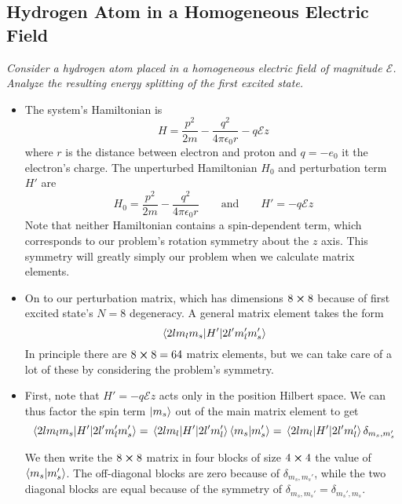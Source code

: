 \documentclass[11pt, a4paper]{article}
\newcommand{\eqtext}[1]{\qquad \text{#1} \qquad}
\newcommand{\Ham}{Hamiltonian\xspace}
\newcommand{\E}{\mathcal{E}}  %
\begin{document}
\subsection{Hydrogen Atom in a Homogeneous Electric Field}
\textit{Consider a hydrogen atom placed in a homogeneous electric field of magnitude $ \E $. Analyze the resulting energy splitting of the first excited state.}
\begin{itemize}
	\item The system's \Ham is 
	\begin{equation*}
		H = \frac{p^{2}}{2m} - \frac{q^{2}}{4\pi \epsilon_{0} r} - q \E z
	\end{equation*}
	where $ r $ is the distance between electron and proton and $ q = -e_{0} $ it the electron's charge. The unperturbed Hamiltonian $ H_{0} $ and perturbation term $ H' $ are
	\begin{equation*}
		H_{0} = \frac{p^{2}}{2m} - \frac{q^{2}}{4\pi \epsilon_{0} r} \eqtext{and} H' = - q \E z
	\end{equation*}
	Note that neither \Ham contains a spin-dependent term, which corresponds to our problem's rotation symmetry about the $ z $ axis. This symmetry will greatly simply our problem when we calculate matrix elements. 

	\item On to our perturbation matrix, which has dimensions $ 8 \cross 8 $ because of first excited state's $ N = 8 $ degeneracy. A general matrix element takes the form
	\begin{equation*}
		\mel{2lm_{l}m_{s}}{H'}{2l'm_{l}'m_{s}'} 
	\end{equation*}
	In principle there are $ 8 \cross 8 = 64 $ matrix elements, but we can take care of a lot of these by considering the problem's symmetry. 
	
	\item First, note that $ H' = - q \E z $ acts only in the position Hilbert space. We can thus factor the spin term $ \ket{m_{s}} $ out of the main matrix element to get
	\begin{equation*}
		\mel{2lm_{l}m_{s}}{H'}{2l'm_{l}'m_{s}'} = \mel{2lm_{l}}{H'}{2l'm_{l}'}\braket{m_{s}}{m_{s}'} = \mel{2lm_{l}}{H'}{2l'm_{l}'} \delta_{m_{s}, m_{s}'}
	\end{equation*}
	
	We then write the $ 8 \cross 8 $ matrix in four blocks  of size $ 4 \cross 4 $ the value of $ \braket{m_{s}}{m_{s}'} $. The off-diagonal blocks are zero because of $ \delta_{m_{s}, m_{s}'} $, while the two diagonal blocks are equal because of the symmetry of $ \delta_{m_{s}, m_{s}'} = \delta_{m_{s}', m_{s}}$. 
	

\end{itemize}
\end{document}
